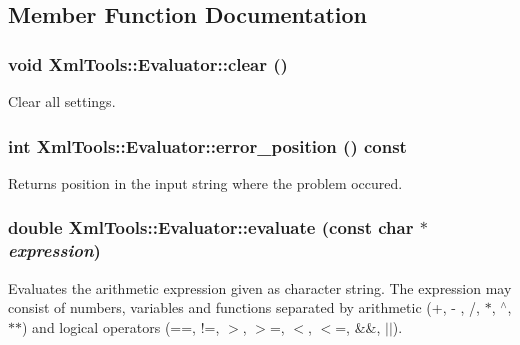 \subsection{Member Function Documentation}
\hypertarget{class_xml_tools_1_1_evaluator_ab54a35f068996b3c402c575f3aea242f}{
\subsubsection[{clear}]{\setlength{\rightskip}{0pt plus 5cm}void XmlTools::Evaluator::clear ()}}
\label{class_xml_tools_1_1_evaluator_ab54a35f068996b3c402c575f3aea242f}
Clear all settings. \hypertarget{class_xml_tools_1_1_evaluator_af036858d3fe40671448306c572e0fd8f}{
\subsubsection[{error\_\-position}]{\setlength{\rightskip}{0pt plus 5cm}int XmlTools::Evaluator::error\_\-position () const}}
\label{class_xml_tools_1_1_evaluator_af036858d3fe40671448306c572e0fd8f}
Returns position in the input string where the problem occured. \hypertarget{class_xml_tools_1_1_evaluator_a602611e00d06e6fa2b8c5a1b292c2747}{
\subsubsection[{evaluate}]{\setlength{\rightskip}{0pt plus 5cm}double XmlTools::Evaluator::evaluate (const char $\ast$ {\em expression})}}
\label{class_xml_tools_1_1_evaluator_a602611e00d06e6fa2b8c5a1b292c2747}
Evaluates the arithmetic expression given as character string. The expression may consist of numbers, variables and functions separated by arithmetic (+, -\/ , /, $\ast$, $^\wedge$, $\ast$$\ast$) and logical operators (==, !=, $>$, $>$=, $<$, $<$=, \&\&, $|$$|$).



